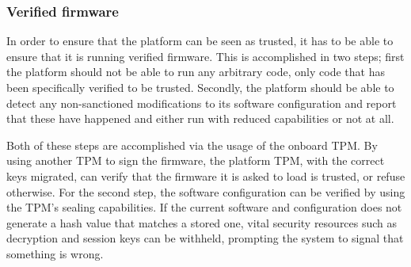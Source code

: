 \documentclass[10pt]{article}
\begin{document}
      \subsubsection{Verified firmware}

        In order to ensure that the platform can be seen as trusted, it has to
        be able to ensure that it is running verified firmware. This is
        accomplished in two steps; first the platform should not be able to run
        any arbitrary code, only code that has been specifically verified to be
        trusted. Secondly, the platform should be able to detect any
        non-sanctioned modifications to its software configuration and report
        that these have happened and either run with reduced capabilities or
        not at all.

        Both of these steps are accomplished via the usage of the onboard TPM.
        By using another TPM to sign the firmware, the platform TPM, with
        the correct keys migrated, can verify that the firmware it is asked to
        load is trusted, or refuse otherwise. For the second step, the software
        configuration can be verified by using the TPM's sealing capabilities.
        If the current software and configuration does not generate a hash
        value that matches a stored one, vital security resources such as
        decryption and session keys can be withheld, prompting the system to
        signal that something is wrong.
\end{document}

